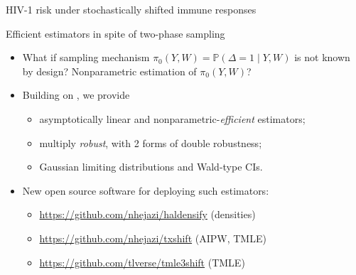 \documentclass{beamer}
\newcommand{\pr}{\mathbb{P}}
\begin{document}
\begin{frame}[c]{HIV-1 risk under stochastically shifted immune responses}

\centering
{}

\note{
}

\end{frame}


\begin{frame}[c]{Efficient estimators in spite of two-phase sampling}

\begin{center}
\begin{itemize}
  \itemsep10pt
  \item What if sampling mechanism $\pi_0(Y, W) = \pr(\Delta=1 \mid Y,W)$
    is not known by design? Nonparametric estimation of $\pi_0(Y, W)$?
  \item Building on \cite{rose2011targeted2sd}, we provide
    \begin{itemize}
      \itemsep4pt
      \item asymptotically linear and nonparametric-\textit{efficient}
        estimators;
      \item multiply \textit{robust}, with 2 forms of double robustness;
      \item Gaussian limiting distributions and Wald-type CIs.
    \end {itemize}
  \item New open source software for deploying such estimators:
    \begin{itemize}
      \itemsep4pt
      \item \url{https://github.com/nhejazi/haldensify} (densities)
      \item \url{https://github.com/nhejazi/txshift} (AIPW, TMLE)
      \item \url{https://github.com/tlverse/tmle3shift} (TMLE)
    \end {itemize}
\end{itemize}
\end{center}


\end{frame}
\end{document}
